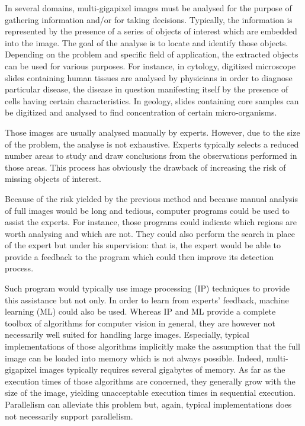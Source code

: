 In several domains, multi-gigapixel images must be analysed for the purpose of gathering information and/or for taking decisions. Typically, the information is represented by the presence of a series of objects of interest which are embedded into the image. The goal of the analyse is to locate and identify those objects. Depending on the problem and  specific field of application, the extracted objects can be used for various purposes. For instance, in cytology, digitized microscope slides containing human tissues are analysed by physicians in order to diagnose particular disease, the disease in question manifesting itself by the presence of cells having certain characteristics. In geology, slides containing core samples can be digitized and analysed to find concentration of certain micro-organisms.

Those images are usually analysed manually by experts. However, due to the size of the problem, the analyse is not exhaustive. Experts typically selects a reduced number areas to study and draw conclusions from the observations performed in those areas. This process has obviously the drawback of increasing the risk of missing objects of interest.

Because of the risk yielded by the previous method and because manual analysis of full images would be long and tedious, computer programs could be used to assist the experts. For instance, those programs could indicate which regions are worth analysing and which are not. They could also perform the search in place of the expert but under his supervision: that is, the expert would be able to provide a feedback to the program which could then improve its detection process. 

Such program would typically use image processing (IP) techniques to provide this assistance but not only. In order to learn from experts' feedback, machine learning (ML) could also be used. Whereas IP and ML provide a complete toolbox of algorithms for computer vision in general, they are however not necessarily well suited for handling large images. Especially, typical implementations of those algorithms implicitly make the assumption that the full image can be loaded into memory which is not always possible. Indeed, multi-gigapixel images typically requires several gigabytes of memory. As far as the execution times of those algorithms are concerned, they generally grow with the size of the image, yielding unacceptable execution times in sequential execution. Parallelism can alleviate this problem but, again, typical implementations does not necessarily support parallelism. 

